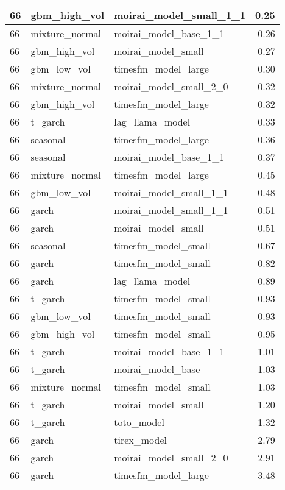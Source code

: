 {\begin{tabular}{lllr}
\midrule
66 & gbm\_high\_vol & moirai\_model\_small\_1\_1 & 0.25 \\
\midrule
66 & mixture\_normal & moirai\_model\_base\_1\_1 & 0.26 \\
\midrule
66 & gbm\_high\_vol & moirai\_model\_small & 0.27 \\
\midrule
66 & gbm\_low\_vol & timesfm\_model\_large & 0.30 \\
\midrule
66 & mixture\_normal & moirai\_model\_small\_2\_0 & 0.32 \\
\midrule
66 & gbm\_high\_vol & timesfm\_model\_large & 0.32 \\
\midrule
66 & t\_garch & lag\_llama\_model & 0.33 \\
\midrule
66 & seasonal & timesfm\_model\_large & 0.36 \\
\midrule
66 & seasonal & moirai\_model\_base\_1\_1 & 0.37 \\
\midrule
66 & mixture\_normal & timesfm\_model\_large & 0.45 \\
\midrule
66 & gbm\_low\_vol & moirai\_model\_small\_1\_1 & 0.48 \\
\midrule
66 & garch & moirai\_model\_small\_1\_1 & 0.51 \\
\midrule
66 & garch & moirai\_model\_small & 0.51 \\
\midrule
66 & seasonal & timesfm\_model\_small & 0.67 \\
\midrule
66 & garch & timesfm\_model\_small & 0.82 \\
\midrule
66 & garch & lag\_llama\_model & 0.89 \\
\midrule
66 & t\_garch & timesfm\_model\_small & 0.93 \\
\midrule
66 & gbm\_low\_vol & timesfm\_model\_small & 0.93 \\
\midrule
66 & gbm\_high\_vol & timesfm\_model\_small & 0.95 \\
\midrule
66 & t\_garch & moirai\_model\_base\_1\_1 & 1.01 \\
\midrule
66 & t\_garch & moirai\_model\_base & 1.03 \\
\midrule
66 & mixture\_normal & timesfm\_model\_small & 1.03 \\
\midrule
66 & t\_garch & moirai\_model\_small & 1.20 \\
\midrule
66 & t\_garch & toto\_model & 1.32 \\
\midrule
66 & garch & tirex\_model & 2.79 \\
\midrule
66 & garch & moirai\_model\_small\_2\_0 & 2.91 \\
\midrule
66 & garch & timesfm\_model\_large & 3.48 \\

\end{tabular}}
